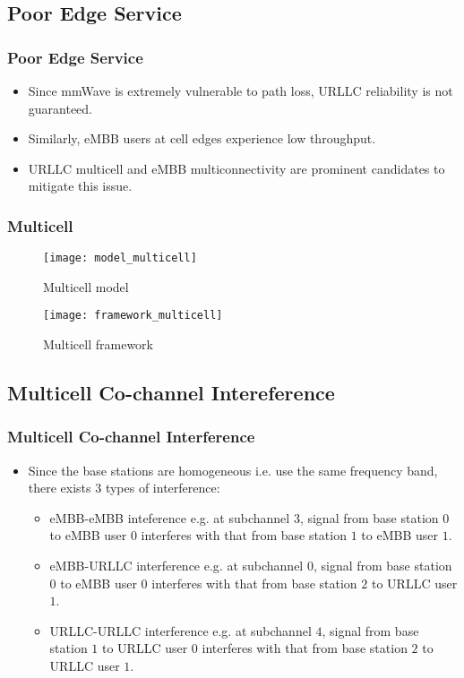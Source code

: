 \subsection{Poor Edge Service}
\begin{frame}
  \frametitle{Poor Edge Service}
  \begin{itemize}
    \item Since mmWave is extremely vulnerable to path loss, URLLC reliability is not guaranteed.
    \item Similarly, eMBB users at cell edges experience low throughput.
  \end{itemize}
\end{frame}

\begin{frame}
  \begin{itemize}
    \item URLLC multicell and eMBB multiconnectivity are prominent candidates to mitigate this issue.
  \end{itemize}
\end{frame}

\begin{frame}
  \frametitle{Multicell}
  \begin{figure}
    \texttt{[image: model\_multicell]}
    \caption{Multicell model}
  \end{figure}
\end{frame}

\begin{frame}
  \begin{figure}
    \texttt{[image: framework\_multicell]}
    \caption{Multicell framework}
  \end{figure}
\end{frame}

\subsection{Multicell Co-channel Intereference}
\begin{frame}
  \frametitle{Multicell Co-channel Interference}
  \begin{itemize}
    \item Since the base stations are homogeneous i.e. use the same frequency band, there exists 3 types of interference:
      \begin{itemize}
        \item eMBB-eMBB inteference e.g. at subchannel $3$, signal from base station $0$ to eMBB user $0$ interferes with that from base station $1$ to eMBB user $1$.
        \item eMBB-URLLC interference e.g. at subchannel $0$, signal from base station $0$ to eMBB user $0$ interferes with that from base station $2$ to URLLC user $1$.
        \item URLLC-URLLC interference e.g. at subchannel $4$, signal from base station $1$ to URLLC user $0$ interferes with that from base station $2$ to URLLC user $1$.
      \end{itemize}
  \end{itemize}
\end{frame}

